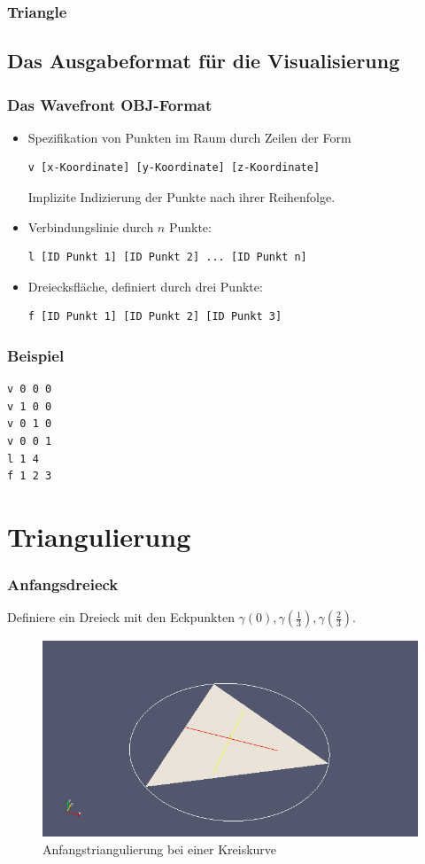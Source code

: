 \documentclass{beamer}
\begin{document}
\begin{frame}
	\frametitle{Triangle}
	
\end{frame}

\subsection{Das Ausgabeformat für die Visualisierung}

\begin{frame}[fragile]
	\frametitle{Das Wavefront OBJ-Format}
	\begin{itemize}
		\item
			Spezifikation von Punkten im Raum durch Zeilen der Form
			\begin{verbatim}
v [x-Koordinate] [y-Koordinate] [z-Koordinate]
			\end{verbatim}
			Implizite Indizierung der Punkte nach ihrer Reihenfolge.
		\item
			Verbindungslinie durch $n$ Punkte:
			\begin{verbatim}
l [ID Punkt 1] [ID Punkt 2] ... [ID Punkt n]
			\end{verbatim}
		\item
			Dreiecksfläche, definiert durch drei Punkte:
			\begin{verbatim}
f [ID Punkt 1] [ID Punkt 2] [ID Punkt 3]
			\end{verbatim}
	\end{itemize}
\end{frame}

\begin{frame}[fragile]
	\frametitle{Beispiel}
	\begin{verbatim}
v 0 0 0
v 1 0 0
v 0 1 0
v 0 0 1
l 1 4
f 1 2 3
	\end{verbatim}
\end{frame}


\section{Triangulierung}

\begin{frame}
	\frametitle{Anfangsdreieck}

	Definiere ein Dreieck mit den Eckpunkten $\gamma(0), \gamma(\frac 13), \gamma(\frac 23)$.
	\begin{figure}
		\caption{Anfangstriangulierung bei einer Kreiskurve}
		\includegraphics[width=0.8 \linewidth]{kreis0.png}
	\end{figure}
\end{frame}
\end{document}
